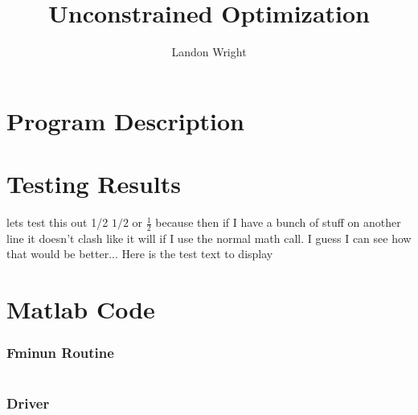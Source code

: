\documentclass{article}
\newcommand{\test}{Here is the test text to display}
\begin{document}
\title{Unconstrained Optimization}
\author{Landon Wright}
\maketitle
\section{Program Description}
\section{Testing Results}
lets test this out 1/2 $1/2$ or $\frac{1}{2}$ because then if I have a bunch of stuff on another line it doesn't clash like it will if I use the normal math call.  I guess I can see how that would be better... \test
\section{Matlab Code}
\subsubsection{Fminun Routine}
\inputminted[xleftmargin=20pt,linenos]{matlab}{fminun.m}
\subsubsection{Driver}
\inputminted[xleftmargin=20pt,linenos]{matlab}{fminunDriv.m}


\end{document}
